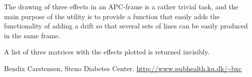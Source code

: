 \begin{Details}\relax
The drawing of three effects in an APC-frame is a rather trivial task,
and the main purpose of the utility is to provide a function that
easily adds the functionality of adding a drift so that several sets
of lines can be easily produced in the same frame.
\end{Details}
\begin{Value}
A list of three matrices with the effects plotted is
returned invisibly.
\end{Value}
\begin{Author}\relax
Bendix Carstensen, Steno Diabetes Center,
\url{http://www.pubhealth.ku.dk/~bxc}
\end{Author}
\begin{References}\relax
\end{References}
\begin{SeeAlso}\relax
{}
\end{SeeAlso}

